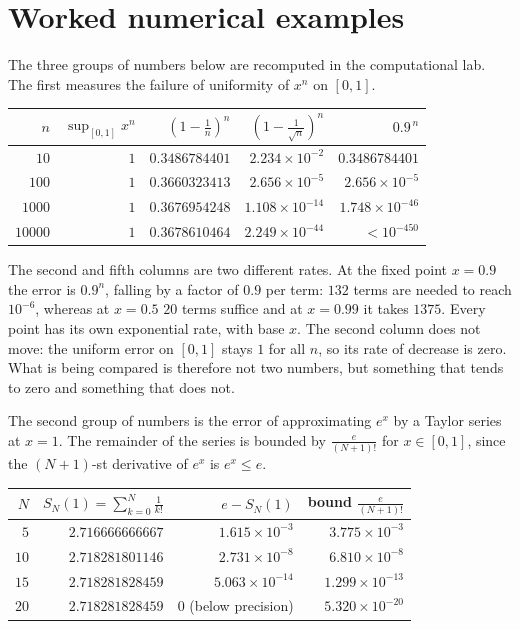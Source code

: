 \section{Worked numerical examples}

The three groups of numbers below are recomputed in the computational lab. The first
measures the failure of uniformity of $x^n$ on $[0,1]$.

\begin{center}
\small
\begin{tabular}{rrrrr}
\hline
$n$ & $\sup_{[0,1]}x^n$ & $(1-\tfrac1n)^n$ & $(1-\tfrac1{\sqrt n})^n$ & $0.9^{\,n}$\\
\hline
$10$    & $1$ & $0.3486784401$ & $2.234\times10^{-2}$ & $0.3486784401$\\
$100$   & $1$ & $0.3660323413$ & $2.656\times10^{-5}$ & $2.656\times10^{-5}$\\
$1000$  & $1$ & $0.3676954248$ & $1.108\times10^{-14}$ & $1.748\times10^{-46}$\\
$10000$ & $1$ & $0.3678610464$ & $2.249\times10^{-44}$ & $<10^{-450}$\\
\hline
\end{tabular}
\end{center}

The second and fifth columns are two different rates. At the fixed point $x=0.9$
the error is $0.9^n$, falling by a factor of $0.9$ per term: $132$ terms are needed to
reach $10^{-6}$, whereas at $x=0.5$ $20$ terms suffice and at $x=0.99$ it takes
$1375$. Every point has its own exponential rate, with base $x$. The second
column does not move: the uniform error on $[0,1]$ stays $1$ for all $n$, so
its rate of decrease is zero. What is being compared is therefore not two numbers,
but something that tends to zero and something that does not.

The second group of numbers is the error of approximating $e^{x}$ by a Taylor series at
$x=1$. The remainder of the series is bounded by $\frac{e}{(N+1)!}$ for $x\in[0,1]$, since
the $(N+1)$-st derivative of $e^x$ is $e^x\le e$.

\begin{center}
\small
\begin{tabular}{rrrr}
\hline
$N$ & $S_N(1)=\sum_{k=0}^{N}\frac{1}{k!}$ & $e-S_N(1)$ & bound $\frac{e}{(N+1)!}$\\
\hline
$5$  & $2.716666666667$ & $1.615\times10^{-3}$ & $3.775\times10^{-3}$\\
$10$ & $2.718281801146$ & $2.731\times10^{-8}$ & $6.810\times10^{-8}$\\
$15$ & $2.718281828459$ & $5.063\times10^{-14}$ & $1.299\times10^{-13}$\\
$20$ & $2.718281828459$ & $0$ (below precision) & $5.320\times10^{-20}$\\
\hline
\end{tabular}
\end{center}

